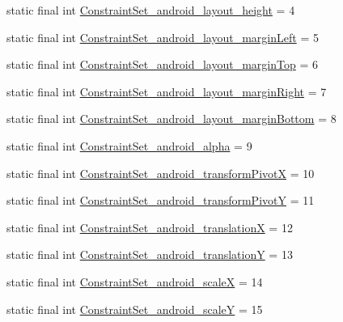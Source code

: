 \begin{DoxyCompactItemize}
\item 
static final int \mbox{\hyperlink{classandroid_1_1support_1_1constraint_1_1R_1_1styleable_aaee9b974cfb57692cca7a54f97ade5f5}{Constraint\+Set\+\_\+android\+\_\+layout\+\_\+height}} = 4
\item 
static final int \mbox{\hyperlink{classandroid_1_1support_1_1constraint_1_1R_1_1styleable_a6f570437593261ace57cf0f1f24c67d7}{Constraint\+Set\+\_\+android\+\_\+layout\+\_\+margin\+Left}} = 5
\item 
static final int \mbox{\hyperlink{classandroid_1_1support_1_1constraint_1_1R_1_1styleable_a51be68bffc4bb199bede3cf5e91a070d}{Constraint\+Set\+\_\+android\+\_\+layout\+\_\+margin\+Top}} = 6
\item 
static final int \mbox{\hyperlink{classandroid_1_1support_1_1constraint_1_1R_1_1styleable_a6003ce07a1eaec8bb5db380b778ca50d}{Constraint\+Set\+\_\+android\+\_\+layout\+\_\+margin\+Right}} = 7
\item 
static final int \mbox{\hyperlink{classandroid_1_1support_1_1constraint_1_1R_1_1styleable_adf19e921352fb16431c6a86577081249}{Constraint\+Set\+\_\+android\+\_\+layout\+\_\+margin\+Bottom}} = 8
\item 
static final int \mbox{\hyperlink{classandroid_1_1support_1_1constraint_1_1R_1_1styleable_a8471fef09cf72eaaacf4d59a3438380c}{Constraint\+Set\+\_\+android\+\_\+alpha}} = 9
\item 
static final int \mbox{\hyperlink{classandroid_1_1support_1_1constraint_1_1R_1_1styleable_ab451e2e87598a7e2cffcfc11b8acb7c6}{Constraint\+Set\+\_\+android\+\_\+transform\+PivotX}} = 10
\item 
static final int \mbox{\hyperlink{classandroid_1_1support_1_1constraint_1_1R_1_1styleable_ac7f0a1358bbe22a6031fd70ed94d3982}{Constraint\+Set\+\_\+android\+\_\+transform\+PivotY}} = 11
\item 
static final int \mbox{\hyperlink{classandroid_1_1support_1_1constraint_1_1R_1_1styleable_a6020c0928dcc85df8c8a2992812d3a68}{Constraint\+Set\+\_\+android\+\_\+translationX}} = 12
\item 
static final int \mbox{\hyperlink{classandroid_1_1support_1_1constraint_1_1R_1_1styleable_a497ff53e1e9813f93a95af209a271541}{Constraint\+Set\+\_\+android\+\_\+translationY}} = 13
\item 
static final int \mbox{\hyperlink{classandroid_1_1support_1_1constraint_1_1R_1_1styleable_afb8151f55ba5f9686147eb6623b574dd}{Constraint\+Set\+\_\+android\+\_\+scaleX}} = 14
\item 
static final int \mbox{\hyperlink{classandroid_1_1support_1_1constraint_1_1R_1_1styleable_af43f35d4778c0c37a7672e5b71496361}{Constraint\+Set\+\_\+android\+\_\+scaleY}} = 15

\end{DoxyCompactItemize}
